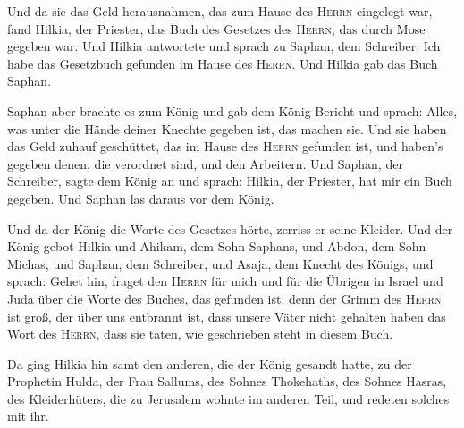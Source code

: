  Und da sie das Geld herausnahmen, das zum Hause des
\textsc{Herrn} eingelegt war, fand Hilkia, der Priester, das Buch des
Gesetzes des \textsc{Herrn}, das durch Mose gegeben war. 
Und Hilkia antwortete und sprach zu Saphan, dem Schreiber: Ich habe das
Gesetzbuch gefunden im Hause des \textsc{Herrn}. Und Hilkia gab das Buch
Saphan.

 Saphan aber brachte es zum König und gab dem König
Bericht und sprach: Alles, was unter die Hände deiner Knechte gegeben
ist, das machen sie.  Und sie haben das Geld zuhauf
geschüttet, das im Hause des \textsc{Herrn} gefunden ist, und haben's
gegeben denen, die verordnet sind, und den Arbeitern. 
Und Saphan, der Schreiber, sagte dem König an und sprach: Hilkia, der
Priester, hat mir ein Buch gegeben. Und Saphan las daraus vor dem König.

 Und da der König die Worte des Gesetzes hörte, zerriss
er seine Kleider.  Und der König gebot Hilkia und Ahikam,
dem Sohn Saphans, und Abdon, dem Sohn Michas, und Saphan, dem Schreiber,
und Asaja, dem Knecht des Königs, und sprach:  Gehet hin,
fraget den \textsc{Herrn} für mich und für die Übrigen in Israel und
Juda über die Worte des Buches, das gefunden ist; denn der Grimm des
\textsc{Herrn} ist groß, der über uns entbrannt ist, dass unsere Väter
nicht gehalten haben das Wort des \textsc{Herrn}, dass sie täten, wie
geschrieben steht in diesem Buch.

 Da ging Hilkia hin samt den anderen, die der König
gesandt hatte, zu der Prophetin Hulda, der Frau Sallums, des Sohnes
Thokehaths, des Sohnes Hasras, des Kleiderhüters, die zu Jerusalem
wohnte im anderen Teil, und redeten solches mit ihr.

